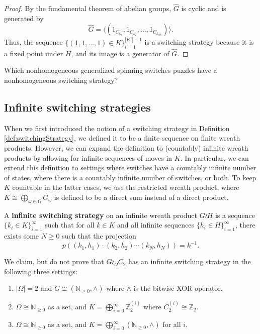 \begin{proof}
  By the fundamental theorem of abelian groups, $\hat{G}$ is cyclic and is
  generated by \begin{equation}
    \hat{G} = \langle(1_{C_{k_1}}, 1_{C_{k_2}}, \dots, 1_{C_{k_{|\Omega|}}})\rangle.
  \end{equation}
  Thus, the sequence $\{(1,1,\dots,1) \in K\}_{i=1}^{|K'|-1}$ is a switching
  strategy because it is a fixed point under $H$, and its image is a generator
  of $\hat{G}$.
\end{proof}

\begin{openquestion}
  Which nonhomogeneous generalized spinning switches puzzles have
  a nonhomogeneous switching strategy?
\end{openquestion}

\subsection{Infinite switching strategies}
When we first introduced the notion of a switching strategy in
Definition \ref{def:switchingStrategy},
we defined it to be a finite sequence on finite wreath products.
However, we can expand the definition to (countably) infinite wreath products
by allowing for infinite sequences of moves in $K$.
In particular, we can extend this definition to settings where
switches have a countably infinite number of states,
where there is a countably infinite number of switches,
or both.
To keep $K$ countable in the latter cases,
we use the restricted wreath product, where
$K \cong \bigoplus_{\omega \in \Omega} G_\omega$ is defined to be a direct
sum instead of a direct product.

\begin{definition}
  A \textbf{infinite switching strategy} on an infinite wreath product $G \wr H$
  is a sequence $\{k_i \in K\}_{i=1}^\infty$ such that for all $k \in K$ and
  all infinite sequences ${\{h_i \in H\}_{i=1}^\infty}$,
  there exists some $N \geq 0$ such that the projection \begin{equation}
    p((k_1, h_1)\cdot(k_2, h_2)\cdots(k_N, h_N)) = k^{-1}.
  \end{equation}
\end{definition}

We claim, but do not prove that $G \wr_\Omega C_2$ has an infinite switching
strategy in the following three settings: \begin{enumerate}
  \item $|\Omega| = 2$ and $G \cong (\mathbb N_{\geq 0}, \wedge)$ where $\wedge$ is the bitwise XOR operator.
  \item $\Omega \cong \mathbb N_{\geq 0}$ as a set, and $K = \bigoplus_{i=0}^\infty \mathbb Z_2^{(i)}$ where $C_2^{(i)} \cong \mathbb Z_2$.
  \item $\Omega \cong \mathbb N_{\geq 0}$ as a set, and $K = \bigoplus_{i=0}^\infty (\mathbb N_{\geq 0}, \wedge)$ for all $i$.
\end{enumerate}

